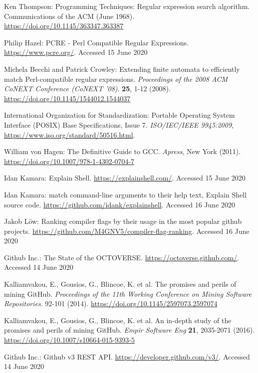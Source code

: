 \documentclass[9pt, a4paper, twocolumn]{article}
\begin{document}
\begin{thebibliography}{99}
	 Ken Thompson: Programming Techniques: Regular expression search algorithm. Communications of the ACM (June 1968). \url{https://doi.org/10.1145/363347.363387}

	 Philip Hazel: PCRE - Perl Compatible Regular Expressions. \url{https://www.pcre.org/}. Accessed 15 June 2020

	 Michela Becchi and Patrick Crowley: Extending finite automata to efficiently match Perl-compatible regular expressions. \textit{Proceedings of the 2008 ACM CoNEXT Conference (CoNEXT ’08)}. \textbf{25}, 1-12 (2008). \url{https://doi.org/10.1145/1544012.1544037}
	
	 International Organization for Standardization: Portable Operating System Interface (POSIX) Base Specifications, Issue 7. \textit{ISO/IEC/IEEE 9945:2009}, \url{https://www.iso.org/standard/50516.html}.
	
	 William von Hagen: The Definitive Guide to GCC. \textit{Apress}, New York (2011). \url{https://doi.org/10.1007/978-1-4302-0704-7}

	 Idan Kamara: Explain Shell. \url{https://explainshell.com/}. Accessed 15 June 2020
	
	 Idan Kamara: match command-line arguments to their help text, Explain Shell source code. \url{https://github.com/idank/explainshell}. Accessed 16 June 2020
	
	 Jakob Löw: Ranking compiler flags by their usage in the most popular github projects. \url{https://github.com/M4GNV5/compiler-flag-ranking}. Accessed 16 June 2020

	 Github Inc.: The State of the OCTOVERSE. \url{https://octoverse.github.com/}. Accessed 14 June 2020
	
	 Kalliamvakou, E., Gousios, G., Blincoe, K. et al. The promises and perils of mining GitHub. \textit{Proceedings of the 11th Working Conference on Mining Software Repositories}. 92-101 (2014). \url{https://doi.org/10.1145/2597073.2597074}
	
	 Kalliamvakou, E., Gousios, G., Blincoe, K. et al. An in-depth study of the promises and perils of mining GitHub. \textit{Empir Software Eng} \textbf{21}, 2035-2071 (2016). \url{https://doi.org/10.1007/s10664-015-9393-5}
	
	 Github Inc.: Github v3 REST API. \url{https://developer.github.com/v3/}. Accessed 14 June 2020


\end{thebibliography}
\end{document}

